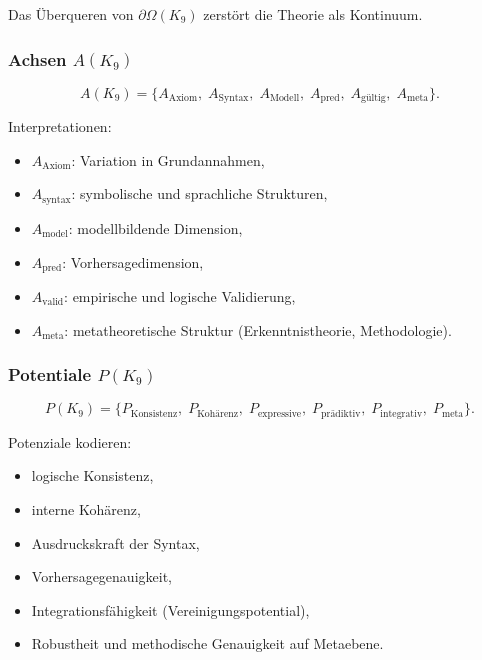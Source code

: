 Das Überqueren von $\partial\Omega(K_9)$ zerstört die Theorie als Kontinuum.

\subsubsection{Achsen \texorpdfstring{$A(K_9)$}{A(K_9)}}

\[
A(K_9)=
\{
A_{\mathrm{Axiom}},\;
A_{\mathrm{Syntax}},\;
A_{\mathrm{Modell}},\;
A_{\mathrm{pred}},\;
A_{\mathrm{gültig}},\;
A_{\mathrm{meta}}
\}.
\]

Interpretationen:
\begin{itemize}
    \item $A_{\mathrm{Axiom}}$: Variation in Grundannahmen,
    \item $A_{\mathrm{syntax}}$: symbolische und sprachliche Strukturen,
    \item $A_{\mathrm{model}}$: modellbildende Dimension,
    \item $A_{\mathrm{pred}}$: Vorhersagedimension,
    \item $A_{\mathrm{valid}}$: empirische und logische Validierung,
    \item $A_{\mathrm{meta}}$: metatheoretische Struktur (Erkenntnistheorie, Methodologie).
\end{itemize}

\subsubsection{Potentiale \texorpdfstring{$P(K_9)$}{P(K_9)}}

\[
P(K_9)=
\{
P_{\mathrm{Konsistenz}},\;
P_{\mathrm{Kohärenz}},\;
P_{\mathrm{expressive}},\;
P_{\mathrm{prädiktiv}},\;
P_{\mathrm{integrativ}},\;
P_{\mathrm{meta}}
\}.
\]

Potenziale kodieren:
\begin{itemize}
    \item logische Konsistenz,
    \item interne Kohärenz,
    \item Ausdruckskraft der Syntax,
    \item Vorhersagegenauigkeit,
    \item Integrationsfähigkeit (Vereinigungspotential),
    \item Robustheit und methodische Genauigkeit auf Metaebene.
\end{itemize}

